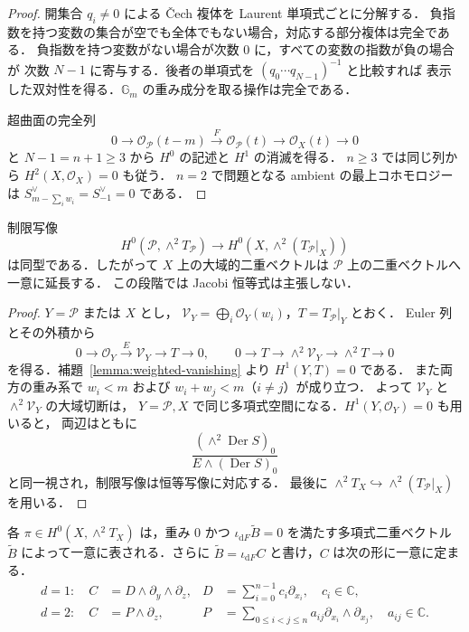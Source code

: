 \begin{proof}
開集合 $q_i\ne0$ による \v Cech 複体を Laurent 単項式ごとに分解する．
負指数を持つ変数の集合が空でも全体でもない場合，対応する部分複体は完全である．
負指数を持つ変数がない場合が次数 $0$ に，すべての変数の指数が負の場合が
次数 $N-1$ に寄与する．後者の単項式を $(q_0\cdots q_{N-1})^{-1}$ と比較すれば
表示した双対性を得る．$\mathbb G_m$ の重み成分を取る操作は完全である．

超曲面の完全列
\[
 0\longrightarrow\mathcal O_{\mathcal P}(t-m)
 \xrightarrow{\ F\ }\mathcal O_{\mathcal P}(t)
 \longrightarrow\mathcal O_X(t)\longrightarrow0
\]
と $N-1=n+1\geq3$ から $H^0$ の記述と $H^1$ の消滅を得る．
$n\geq3$ では同じ列から $H^2(X,\mathcal O_X)=0$ も従う．
$n=2$ で問題となる ambient の最上コホモロジーは
$S_{m-\sum_iw_i}^{\vee}=S_{-1}^{\vee}=0$ である．
\end{proof}

\begin{lemma}
\label{lemma:ambient-restriction}
制限写像
\[
 H^0(\mathcal P,\wedge^2T_{\mathcal P})
 \longrightarrow H^0(X,\wedge^2(T_{\mathcal P}|_X))
\]
は同型である．したがって $X$ 上の大域的二重ベクトルは
$\mathcal P$ 上の二重ベクトルへ一意に延長する．
この段階では Jacobi 恒等式は主張しない．
\end{lemma}

\begin{proof}
$Y=\mathcal P$ または $X$ とし，
$\mathcal V_Y=\bigoplus_i\mathcal O_Y(w_i)$，$T=T_{\mathcal P}|_Y$ とおく．
Euler 列とその外積から
\[
 0\longrightarrow\mathcal O_Y\xrightarrow{E}\mathcal V_Y
 \longrightarrow T\longrightarrow0,
 \qquad
 0\longrightarrow T\longrightarrow\wedge^2\mathcal V_Y
 \longrightarrow\wedge^2T\longrightarrow0
\]
を得る．補題~\ref{lemma:weighted-vanishing} より $H^1(Y,T)=0$ である．
また両方の重み系で $w_i<m$ および $w_i+w_j<m$（$i\ne j$）が成り立つ．
よって $\mathcal V_Y$ と $\wedge^2\mathcal V_Y$ の大域切断は，
$Y=\mathcal P,X$ で同じ多項式空間になる．$H^1(Y,\mathcal O_Y)=0$ も用いると，
両辺はともに
\[
 \frac{(\wedge^2\operatorname{Der}S)_0}
 {E\wedge(\operatorname{Der}S)_0}
\]
と同一視され，制限写像は恒等写像に対応する．
最後に $\wedge^2T_X\hookrightarrow\wedge^2(T_{\mathcal P}|_X)$ を用いる．
\end{proof}

\begin{proposition}
\label{prop:casimir-representative}
各 $\pi\in H^0(X,\wedge^2T_X)$ は，重み $0$ かつ
$\iota_{\mathrm dF}\widetilde B=0$ を満たす多項式二重ベクトル
$\widetilde B$ によって一意に表される．さらに
$\widetilde B=\iota_{\mathrm dF}C$ と書け，$C$ は次の形に一意に定まる．
\begin{align}
 d=1:\quad C&=D\wedge\partial_y\wedge\partial_z,
 &D&=\sum_{i=0}^{n-1}c_i\partial_{x_i},\quad c_i\in\mathbb C,
 \label{eq:degree-one-trivector}\\
 d=2:\quad C&=P\wedge\partial_z,
 &P&=\sum_{0\leq i<j\leq n}a_{ij}\partial_{x_i}\wedge\partial_{x_j},
 \quad a_{ij}\in\mathbb C.
 \label{eq:degree-two-trivector}
\end{align}
\end{proposition}

